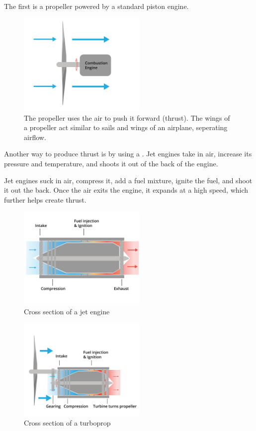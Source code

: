The first is a propeller powered by a standard piston engine.
\begin{figure}[htbp]
  \centering
  \includegraphics[width=0.55\textwidth]{propeller.png}
  \caption{The propeller uses the air to push it forward (thrust). The wings of a propeller act similar to sails and wings of an airplane, seperating airflow.}\label{fig:propeller}
\end{figure}



Another way to produce thrust is by using a . Jet engines take in air, increase its pressure and temperature, and shoots it out of the back of the engine.

Jet engines suck in air, compress it, add a fuel mixture, ignite the fuel, and shoot it out the back. Once the air exits the engine, it expands at a high speed, which further helps create thrust.

\begin{figure}[htbp]
  \centering
  \includegraphics[width=0.55\textwidth]{jet.png}
  \caption{Cross section of a jet engine}\label{fig:jet}
\end{figure}


\begin{figure}[htbp]
  \centering
  \includegraphics[width=0.55\textwidth]{turboProp.png}
  \caption{Cross section of a turboprop}\label{fig:turboProp}
\end{figure}


